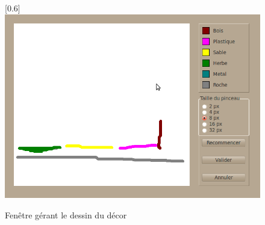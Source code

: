\begin{center}
\begin{figure}[h]
\begin{center}
\scalebox{0.6}[0.6]{\includegraphics*{../images/dessin_decor.jpg}}
\end{center}
\caption{Fenêtre gérant le dessin du décor}
\end{figure}
\end{center}
